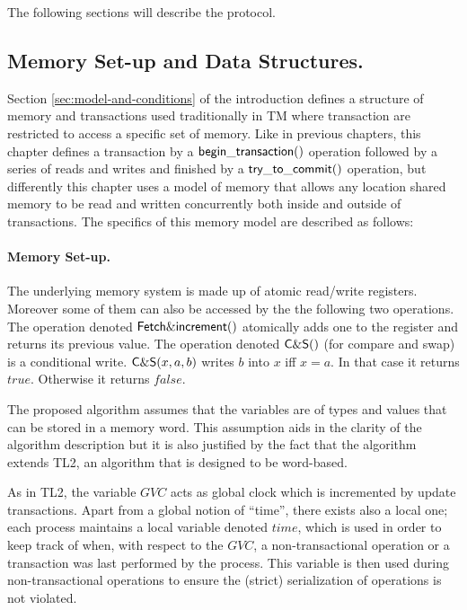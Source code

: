 The following sections will describe the protocol.
\subsection{Memory Set-up and Data Structures.}

Section \ref{sec:model-and-conditions} of the introduction defines a
structure of memory and transactions used traditionally in TM where
transaction are restricted to access a specific set of memory.
Like in previous chapters, this chapter defines a transaction by a $\sf{begin\_transaction}()$ operation
followed by a series of reads and writes and finished by a $\sf{try\_to\_commit}()$ operation,
but differently this chapter uses a model
of memory that allows any location shared memory to be read and written concurrently
both inside and outside of transactions.
The specifics of this memory model are described as follows:

\paragraph{Memory Set-up.}
The underlying memory system is made up of atomic read/write registers. 
Moreover some of them can also be accessed by the the following two 
operations. The operation denoted 
${\sf Fetch\&increment}()$ atomically adds one to the register and 
returns its previous value. 
 The operation denoted 
${\sf C\&S}()$ (for compare and swap) is a conditional write. 
${\sf C\&S}(x,a,b)$ writes $b$ into $x$ iff $x=a$. In that case it 
returns $\mathit{true}$. Otherwise it returns  $\mathit{false}$. 


The proposed algorithm assumes that the
variables  are  of  types and  values  that  can  be   stored in  a  memory
word. This assumption aids in the clarity of the algorithm description  
but it  is also  justified by the  fact that  the algorithm extends  TL2, an
algorithm that is   designed to be word-based. 

As in TL2,  the variable $\mathit{GVC}$
acts as  global  clock  which  is incremented  by update transactions.
 Apart from a global   notion of ``time'', there exists also
a local one; each process maintains a local  
variable denoted $\mathit{time}$,  which is used in order to keep  
track of when, with
respect to the $\mathit{GVC}$, a non-transactional operation 
or a transaction was last performed by
the  process.
This variable is then used during non-transactional operations to ensure
the (strict) serialization of operations is not violated.

